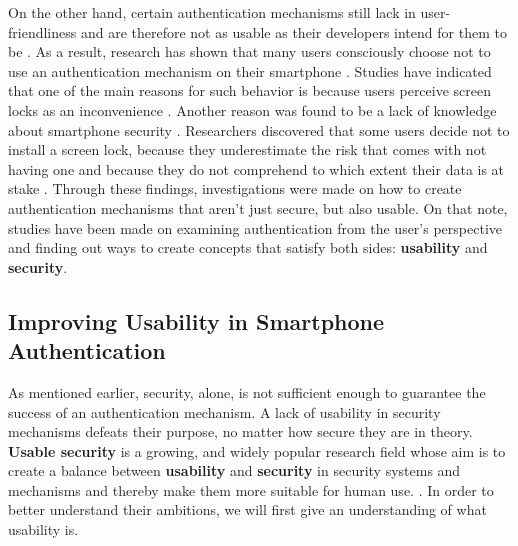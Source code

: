 On the other hand, certain authentication mechanisms still lack in user-friendliness and are therefore not as usable as their developers intend for them to be \cite{Schloeglhofer}. As a result, research has shown that many users consciously choose not to use an authentication mechanism on their smartphone \cite{ediss20251, Albayram:2017:BUL:3235924.3235929, Egelman:2014:YRL:2660267.2660273}. Studies have indicated that one of the main reasons for such behavior is because users perceive screen locks as an inconvenience \cite{Albayram:2017:BUL:3235924.3235929, ediss20251, harbach}. Another reason was found to be a lack of knowledge about smartphone security \cite{Albayram:2017:BUL:3235924.3235929, Adams:1999:UE:322796.322806}. Researchers discovered that some users decide not to install a screen lock, because they underestimate the risk that comes with not having one and because they do not comprehend to which extent their data is at stake \cite{Egelman:2014:YRL:2660267.2660273}. Through these findings, investigations were made on how to create authentication mechanisms that aren't just secure, but also usable. On that note, studies have been made on examining authentication from the user's perspective and finding out ways to create concepts that satisfy both sides: \textbf{usability} and \textbf{security}.  


\subsection{Improving Usability in Smartphone Authentication} \label{2.1.2}

As mentioned earlier, security, alone, is not sufficient enough to guarantee the success of an authentication mechanism. A lack of usability in security mechanisms defeats their purpose, no matter how secure they are in theory. \textbf{Usable security} is a growing, and widely popular research field whose aim is to create a balance between \textbf{usability} and \textbf{security} in security systems and mechanisms and thereby make them more suitable for human use. \cite{Realpe-Munoz, anonymous}. In order to better understand their ambitions, we will first give an understanding of what usability is. \\

